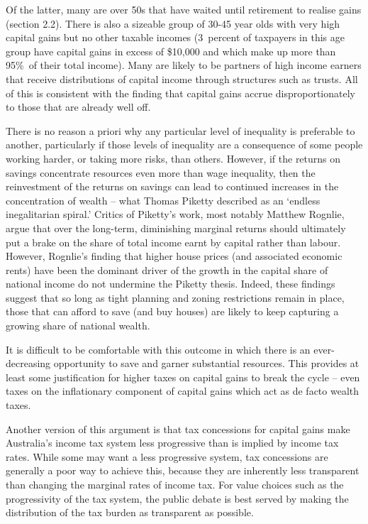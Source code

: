 \documentclass{grattan}\usepackage[]{graphicx}\usepackage[]{color}
\begin{document}
Of the latter, many are over 50s that have waited until retirement to realise gains (section 2.2). There is also a sizeable group of 30-45 year olds with very high capital gains but no other taxable incomes (3~percent of taxpayers in this age group have capital gains in excess of \$10,000 and which make up more than 95\%\ of their total income). Many are likely to be partners of high income earners that receive distributions of capital income through structures such as trusts. All of this is consistent with the finding that capital gains accrue disproportionately to those that are already well off. 

There is no reason a priori why any particular level of inequality is preferable to another, particularly if those levels of inequality are a consequence of some people working harder, or taking more risks, than others.  
However, if the returns on savings concentrate resources even more than wage inequality, then the reinvestment of the returns on savings can lead to continued increases in the concentration of wealth -- what Thomas Piketty described as an `endless inegalitarian spiral.'  Critics of Piketty's work, most notably Matthew Rognlie, argue that over the long-term, diminishing marginal returns should ultimately put a brake on the share of total income earnt by capital rather than labour.  However, Rognlie's finding that higher house prices (and associated economic rents) have been the dominant driver of the growth in the capital share of national income  do not undermine the Piketty thesis. Indeed, these findings suggest that so long as tight planning and zoning restrictions remain in place, those that can afford to save (and buy houses) are likely to keep capturing a growing share of national wealth.  

It is difficult to be comfortable with this outcome in which there is an ever-decreasing opportunity to save and garner substantial resources. This provides at least some justification for higher taxes on capital gains to break the cycle -- even taxes on the inflationary component of capital gains which act as de facto wealth taxes.  

Another version of this argument is that tax concessions for capital gains make Australia's income tax system less progressive than is implied by income tax rates. While some may want a less progressive system, tax concessions are generally a poor way to achieve this, because they are inherently less transparent than changing the marginal rates of income tax. For value choices such as the progressivity of the tax system, the public debate is best served by making the distribution of the tax burden as transparent as possible.
\end{document}
